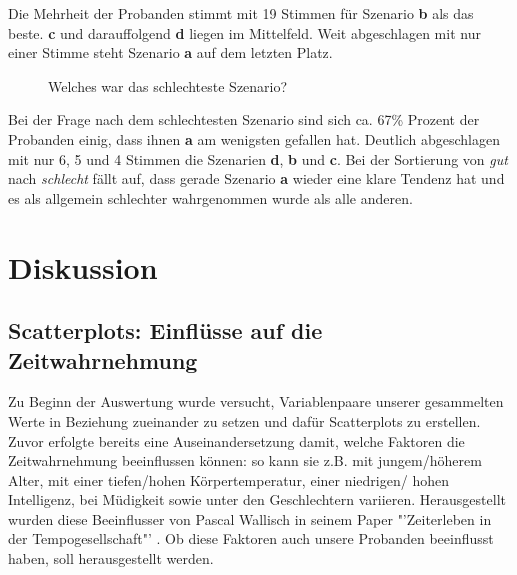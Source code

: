 \documentclass{Paper}
\begin{document}
Die Mehrheit der Probanden stimmt mit 19 Stimmen für Szenario \textbf{b} als das beste. \textbf{c} und darauffolgend \textbf{d} liegen im Mittelfeld. Weit abgeschlagen mit nur einer Stimme steht Szenario \textbf{a} auf dem letzten Platz.
	
	
	\begin{figure}[ht]
\caption{Welches war das schlechteste Szenario?}
\label{SzenarioSchlecht}
\end{figure}
	

Bei der Frage nach dem schlechtesten Szenario sind sich ca. 67\% Prozent der Probanden einig, dass ihnen \textbf{a} am wenigsten gefallen hat. Deutlich abgeschlagen mit nur 6, 5 und 4 Stimmen die Szenarien \textbf{d}, \textbf{b} und \textbf{c}. 
Bei der Sortierung von \textit{gut} nach \textit{schlecht} fällt auf, dass gerade Szenario \textbf{a} wieder eine klare Tendenz hat und es als allgemein schlechter wahrgenommen wurde als alle anderen.


\section{Diskussion}

\subsection{Scatterplots: Einflüsse auf die Zeitwahrnehmung}
Zu Beginn der Auswertung wurde versucht, Variablenpaare unserer gesammelten Werte in Beziehung zueinander zu setzen und dafür Scatterplots zu erstellen. Zuvor erfolgte bereits eine Auseinandersetzung damit, welche Faktoren die Zeitwahrnehmung beeinflussen können: so kann sie z.B. mit jungem/höherem Alter, mit einer tiefen/hohen Körpertemperatur, einer niedrigen/ hohen Intelligenz, bei Müdigkeit sowie unter den Geschlechtern variieren. Herausgestellt wurden diese Beeinflusser von Pascal Wallisch in seinem Paper "'Zeiterleben in der Tempogesellschaft"' \cite{Wallisch2003}. Ob diese Faktoren auch unsere Probanden beeinflusst haben, soll herausgestellt werden.
\end{document}
